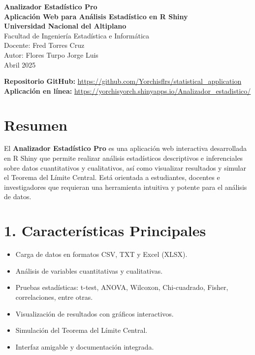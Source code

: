 \documentclass[12pt]{article}
\begin{document}
\begin{center}
    {\LARGE \textbf{Analizador Estadístico Pro}} \\[2mm]
    \vspace{2mm}
    \textbf{Aplicación Web para Análisis Estadístico en R Shiny} \\[5mm]
    
    \textbf{Universidad Nacional del Altiplano} \\ Facultad de Ingeniería Estadística e Informática \\ Docente: Fred Torres Cruz \\ Autor: Flores Turpo Jorge Luis \\ Abril 2025

    \textbf{Repositorio GitHub:} \url{https://github.com/Yorchisflrs/statistical_application} \\[1mm]
    \textbf{Aplicación en línea:} \url{https://yorchisyorch.shinyapps.io/Analizador_estadistico/} \\[8mm]
\end{center}

\vspace{8mm}

\section*{Resumen}
El \textbf{Analizador Estadístico Pro} es una aplicación web interactiva desarrollada en R Shiny que permite realizar análisis estadísticos descriptivos e inferenciales sobre datos cuantitativos y cualitativos, así como visualizar resultados y simular el Teorema del Límite Central. Está orientada a estudiantes, docentes e investigadores que requieran una herramienta intuitiva y potente para el análisis de datos.

\section*{1. Características Principales}
\begin{itemize}
    \item Carga de datos en formatos CSV, TXT y Excel (XLSX).
    \item Análisis de variables cuantitativas y cualitativas.
    \item Pruebas estadísticas: t-test, ANOVA, Wilcoxon, Chi-cuadrado, Fisher, correlaciones, entre otras.
    \item Visualización de resultados con gráficos interactivos.
    \item Simulación del Teorema del Límite Central.
    \item Interfaz amigable y documentación integrada.
\end{itemize}
\end{document}
